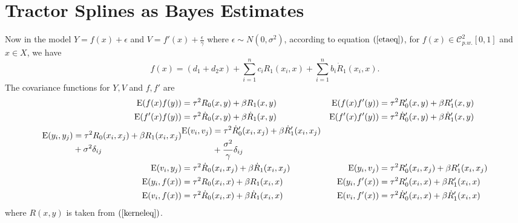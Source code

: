 \section{Tractor Splines as Bayes Estimates}
Now in the model $Y=f(x)+\epsilon$ and $V=f '(x)+\frac{\epsilon}{\gamma}$ where $\epsilon \sim N(0,\sigma^2)$, according to equation $(\ref{etaeq})$, for $f(x) \in \mathcal{C}_{p.w.}^{2}[0,1]$ and $x \in X$, we have
\begin{equation}
f(x)=(d_1+d_2x)+\sum_{i=1}^{n}c_iR_1(x_i,x)+\sum_{i=1}^{n}b_i\dot{R}_1(x_i,x).
\end{equation}
The covariance functions for $Y,V$ and $f , f '$ are
\begin{align*}
\mathrm{E} (f(x)f (y))&=\tau^2R_0(x,y)+\beta R_1(x,y) & \mathrm{E} (f(x)f '(y))&=\tau^2R_0'(x,y)+\beta R_1'(x,y) \\
\mathrm{E} (f '(x)f (y))&=\tau^2\dot{R}_0(x,y)+\beta\dot{R}_1(x,y) & \mathrm{E} (f '(x)f '(y))&=\tau^2\dot{R}'_0(x,y)+\beta\dot{R}'_1(x,y) \\
\begin{split}
\mathrm{E} (y_i,y_j)&=\tau^2R_0(x_i,x_j)+\beta R_1(x_i,x_j)\\ &+\sigma^2\delta_{ij} \end{split}  & \begin{split}
\mathrm{E} (v_i,v_j)&=\tau^2\dot{R}'_0(x_i,x_j)+\beta\dot{R}'_1(x_i,x_j) \\&+\frac{\sigma^2}{\gamma}\delta_{ij}\end{split} \\ 
\mathrm{E} (v_i,y_j)&=\tau^2\dot{R}_0(x_i,x_j)+\beta \dot{R}_1(x_i,x_j) &
\mathrm{E} (y_i,v_j)&=\tau^2R_0'(x_i,x_j)+\beta R_1'(x_i,x_j)\\
\mathrm{E} (y_i,f(x))&=\tau^2 R_0(x_i,x)+\beta R_1(x_i,x)  & \mathrm{E} (y_i,f '(x))&=\tau^2 R'_0(x_i,x)+\beta R'_1(x_i,x)  \\
\mathrm{E} (v_i,f(x))&=\tau^2 \dot{R}_0(x_i,x)+\beta \dot{R}_1(x_i,x) & \mathrm{E} (v_i,f '(x))&=\tau^2\dot{R}'_0(x_i,x)+\beta \dot{R}'_1(x_i,x)
\end{align*}
where $R(x,y)$ is taken from $(\ref{kerneleq})$. 



